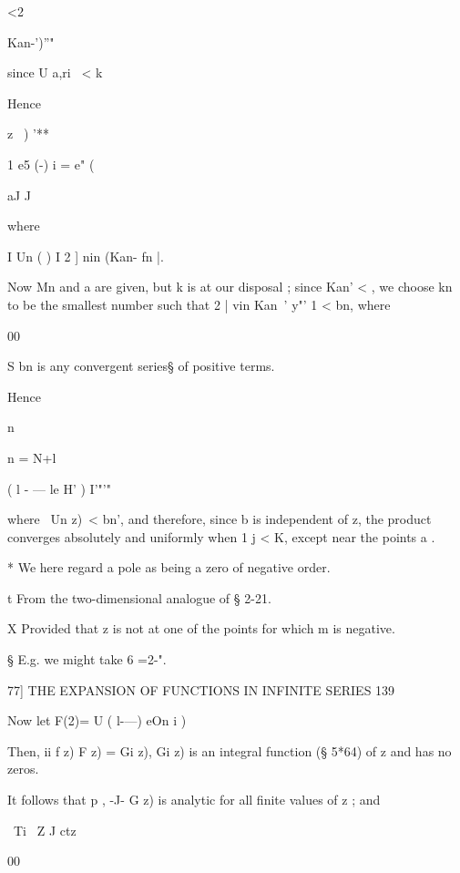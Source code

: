 <2\ \ {Kan-')''"\, 



since U a,ri \ < k 



Hence 



z \ ) '**  

1 e5 (-) i = e" (   

aJ J 



where 



I Un ( ) I   2 ] nin (Kan- fn |. 

Now Mn and a  are given, but k  is at our disposal ; since Kan'  <  , we 
choose kn to be the smallest number such that 2 | vin  Kan~' y"' 1 < bn, where 

00 

S bn is any convergent series§ of positive terms. 



Hence 



n 

n = N+l 



 ( l - — le H' ) I'"'" 






where \ Un z)\ <  bn', and therefore, since b  is independent of z, the product 
converges absolutely and uniformly when 1   j < K, except near the points a . 



* We here regard a pole as being a zero of negative order. 

t From the two-dimensional analogue of § 2-21. 

X Provided that z is not at one of the points    for which m  is negative. 

§ E.g. we might take 6 =2-". 



77] THE EXPANSION OF FUNCTIONS IN INFINITE SERIES 139 

Now let F(2)= U  ( l-—) eOn i ) 

Then, ii f z)   F  z) = Gi z), Gi z) is an integral function (§ 5*64) of z 
and has no zeros. 

It follows that p ,   -J- G   z) is analytic for all finite values of z ; and 

\ Ti \ Z J ctz 

00 

}
